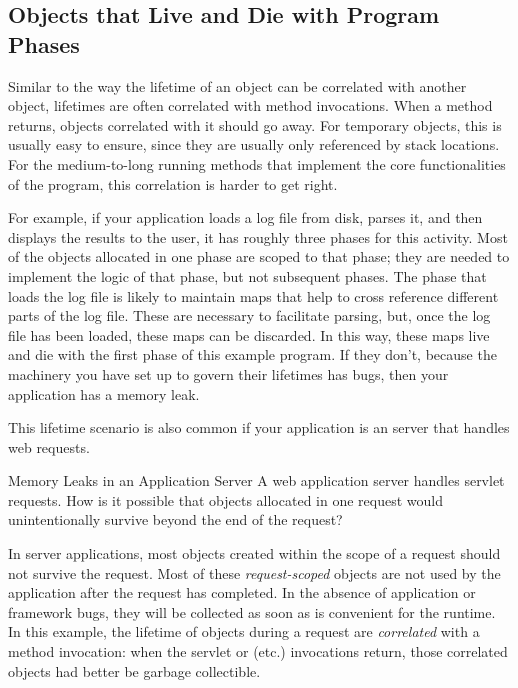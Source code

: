 \subsection{Objects that Live and Die with Program Phases}
\label{correlated-lifetime-2}

Similar to the way the lifetime of an object can be correlated with another
object, lifetimes are often correlated with method invocations. When a method
returns, objects correlated with it should go away. For temporary objects, this
is usually easy to ensure, since they are usually only referenced by stack
locations. For the medium-to-long running methods that implement the
core functionalities of the program, this correlation is harder to get right.

For example, if your application loads a log file from disk,
parses it, and then displays the results to the user, it has roughly three
phases for this activity. Most of the objects allocated in one phase are scoped to that
phase; they are needed to implement the logic of that phase, but not subsequent
phases. The phase that loads the log file is likely to maintain maps that
help to cross reference different parts of the log file. These are necessary
to facilitate parsing, but, once the log file has been loaded, these maps can be
discarded. In this way, these maps live and die with the first phase of this
example program. If they don't, because the machinery you have set up to
govern their lifetimes has bugs, then your application has a memory
leak.

This lifetime scenario is also common if your application is an
server that handles web requests.

\begin{example}{Memory Leaks in an Application Server}
	A web application server handles servlet requests. How is it possible that
	objects allocated in one request would unintentionally survive beyond the end
	of the request?
\end{example} 
  
In server applications, most
objects created within the scope of a request should not survive the
request. Most of these \emph{request-scoped}
 objects are not used by the application after the
request has completed. In the absence of application or framework bugs, they will
be collected as soon as is convenient for the runtime. In this example, the
lifetime of objects during a request are \emph{correlated} with a method
invocation: when the servlet  or  (etc.) invocations
return, those correlated objects had better be garbage collectible.

